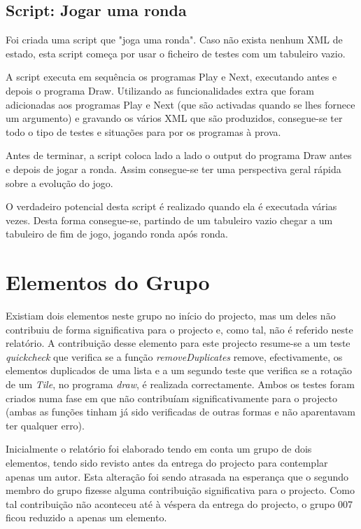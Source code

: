 \documentclass[11pt, a4paper, twoside]{article}
\begin{document}
\subsection{Script: Jogar uma ronda}
Foi criada uma script que "joga uma ronda". Caso não exista nenhum XML de estado, esta script começa por usar o ficheiro de testes com um tabuleiro vazio.

A script executa em sequência os programas Play e Next, executando antes e depois o programa Draw. Utilizando as funcionalidades extra que foram adicionadas aos programas Play e Next (que são activadas quando se lhes fornece um argumento) e gravando os vários XML que são produzidos, consegue-se ter todo o tipo de testes e situações para por os programas à prova.

Antes de terminar, a script coloca lado a lado o output do programa Draw antes e depois de jogar a ronda. Assim consegue-se ter uma perspectiva geral rápida sobre a evolução do jogo.

O verdadeiro potencial desta script é realizado quando ela é executada várias vezes. Desta forma consegue-se, partindo de um tabuleiro vazio chegar a um tabuleiro de fim de jogo, jogando ronda após ronda.

\newpage
\section{Elementos do Grupo}
Existiam dois elementos neste grupo no início do projecto, mas um deles não contribuiu de forma significativa para o projecto e, como tal, não é referido neste relatório. A contribuição desse elemento para este projecto resume-se a um teste \textit{quickcheck} que verifica se a função \textit{removeDuplicates} remove, efectivamente, os elementos duplicados de uma lista e a um segundo teste que verifica se a rotação de um \textit{Tile}, no programa \textit{draw}, é realizada correctamente. Ambos os testes foram criados numa fase em que não contribuíam significativamente para o projecto (ambas as funções tinham já sido verificadas de outras formas e não aparentavam ter qualquer erro).

Inicialmente o relatório foi elaborado tendo em conta um grupo de dois elementos, tendo sido revisto antes da entrega do projecto para contemplar apenas um autor. Esta alteração foi sendo atrasada na esperança que o segundo membro do grupo fizesse alguma contribuição significativa para o projecto. Como tal contribuição não aconteceu até à véspera da entrega do projecto, o grupo 007 ficou reduzido a apenas um elemento.
\end{document}
